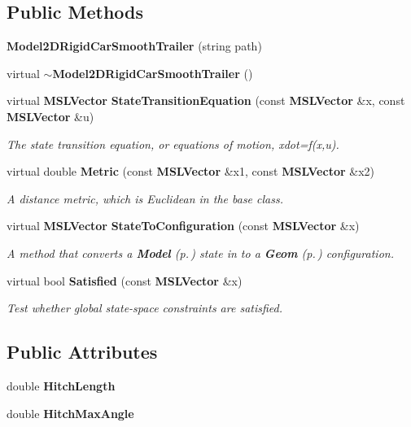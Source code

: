 \subsection*{Public Methods}
\begin{CompactItemize}
\item 
{\bf Model2DRigid\-Car\-Smooth\-Trailer} (string path)
\item 
virtual {\bf $\sim$Model2DRigid\-Car\-Smooth\-Trailer} ()
\item 
virtual {\bf MSLVector} {\bf State\-Transition\-Equation} (const {\bf MSLVector} \&x, const {\bf MSLVector} \&u)
\begin{CompactList}\small\item\em The state transition equation, or equations of motion, xdot=f(x,u).\item\end{CompactList}\item 
virtual double {\bf Metric} (const {\bf MSLVector} \&x1, const {\bf MSLVector} \&x2)
\begin{CompactList}\small\item\em A distance metric, which is Euclidean in the base class.\item\end{CompactList}\item 
virtual {\bf MSLVector} {\bf State\-To\-Configuration} (const {\bf MSLVector} \&x)
\begin{CompactList}\small\item\em A method that converts a {\bf Model} {\rm (p.\,\pageref{classModel})} state in to a {\bf Geom} {\rm (p.\,\pageref{classGeom})} configuration.\item\end{CompactList}\item 
virtual bool {\bf Satisfied} (const {\bf MSLVector} \&x)
\begin{CompactList}\small\item\em Test whether global state-space constraints are satisfied.\item\end{CompactList}\end{CompactItemize}
\subsection*{Public Attributes}
\begin{CompactItemize}
\item 
double {\bf Hitch\-Length}
\item 
double {\bf Hitch\-Max\-Angle}
\end{CompactItemize}



